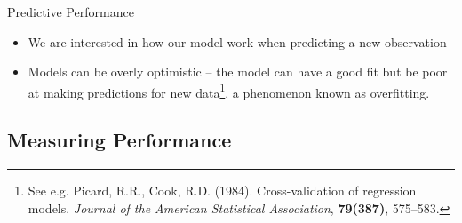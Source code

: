 \documentclass[10pt,handout]{beamer}
\begin{document}
\begin{frame}{Predictive Performance}


\begin{itemize}

\item We are interested in how our model work when predicting a new observation


\pause

\item Models can be overly optimistic -- the model can have a good fit but be poor at making predictions for new data\footnote{See e.g. Picard, R.R., Cook, R.D. (1984). Cross-validation of regression models. \emph{Journal of the American Statistical Association}, \textbf{79(387)}, 575--583.}, a phenomenon known as {\color{uured}overfitting}.\\[3mm]

\end{itemize}

\end{frame}

\subsection{Measuring Performance}
\end{document}
